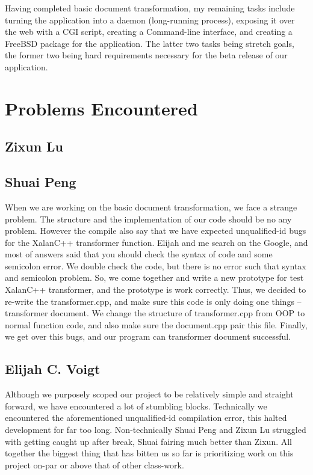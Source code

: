 Having completed basic document transformation, my remaining tasks include turning the application into a daemon (long-running process), exposing it over the web with a CGI script, creating a Command-line interface, and creating a FreeBSD package for the application.
The latter two tasks being stretch goals, the former two being hard requirements necessary for the beta release of our application.

\section{Problems Encountered}

\subsection{Zixun Lu}

\subsection{Shuai Peng}

When we are working on the basic document transformation, we face a strange problem.
The structure and the implementation of our code should be no any problem.
However the compile also say that we have expected unqualified-id bugs for the XalanC++ transformer function.
Elijah and me search on the Google, and most of answers said that you should check the syntax of code and some semicolon error.
We double check the code, but there is no error such that syntax and semicolon problem.
So, we come together and write a new prototype for test XalanC++ transformer, and the prototype is work correctly.
Thus, we decided to re-write the transformer.cpp, and make sure this code is only doing one things -- transformer document.
We change the structure of transformer.cpp from OOP to normal function code, and also make sure the document.cpp pair this file.
Finally, we get over this bugs, and our program can transformer document successful. 

\subsection{Elijah C. Voigt}

Although we purposely scoped our project to be relatively simple and straight forward, we have encountered a lot of stumbling blocks.
Technically we encountered the aforementioned unqualified-id compilation error, this halted development for far too long.
Non-technically Shuai Peng and Zixun Lu struggled with getting caught up after break, Shuai fairing much better than Zixun.
All together the biggest thing that has bitten us so far is prioritizing work on this project on-par or above that of other class-work.

